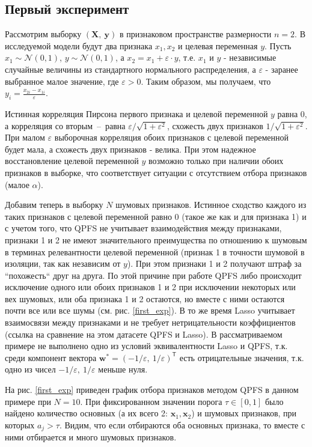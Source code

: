 \documentclass[12pt, twoside]{article}
\newcommand{\bx}{\mathbf{x}}
\newcommand{\by}{\mathbf{y}}
\newcommand{\bw}{\mathbf{w}}
\newcommand{\bX}{\mathbf{X}}
\newcommand{\cN}{\mathcal{N}}
\newcommand{\getT}{^{\mathsf{T}}}
\begin{document}
\subsection{Первый эксперимент}

Рассмотрим выборку $(\bX, \:\by)$ в признаковом пространстве размерности $n=2$. В исследуемой модели будут два признака $x_1, x_2$ и целевая переменная $y$. Пусть $x_1 \sim \cN(0, 1)$, $y \sim \cN(0, 1)$, а $x_2 = x_1 + \varepsilon \cdot y$, т.е. $x_1$ и $y$ - независимые случайные величины из стандартного нормального распределения, а $\varepsilon$ - заранее выбранное малое значение, где $\varepsilon > 0$. Таким образом, мы получаем, что $y_i = \frac{x_{2i} - x_{1i}}{\varepsilon}$.


Истинная корреляция Пирсона первого признака и целевой переменной $y$ равна 0, а корреляция со вторым~--~равна $\varepsilon / \sqrt{1 + \varepsilon^2}$, схожесть двух признаков $1 / \sqrt{1 + \varepsilon^2}$.   
При малом $\varepsilon$ выборочная корреляция обоих признаков с целевой переменной будет мала, а схожесть двух признаков - велика. При этом надежное восстановление целевой переменной $y$ возможно только при наличии обоих признаков в выборке, что соответствует ситуации с отсутствием отбора признаков (малое $\alpha$).

Добавим теперь в выборку $N$ шумовых признаков. Истинное сходство каждого из таких признаков с целевой переменной равно 0 (такое же как и для признака 1) и с учетом того, что QPFS не учитывает взаимодействия между признаками, признаки 1 и 2 не имеют значительного преимущества по отношению к шумовым в терминах релевантности целевой переменной (признак 1 в точности шумовой в изоляции, так как независим от $y$). При этом признаки 1 и 2 получают штраф за ``похожесть`` друг на друга. По этой причине при работе QPFS либо происходит исключение одного или обоих признаков 1 и 2 при исключении некоторых или вех шумовых, или оба признака 1 и 2 остаются, но вместе с ними остаются почти все или все шумы (см. рис. \ref{first_exp}). В то же время Lasso учитывает взаимосвязи между признаками и не требует нетрицательности коэффициентов (ссылка на сравнение на этом датасете QPFS и Lasso). В рассматриваемом примере не выполнено одно из условий эквивалентности Lasso и QPFS, т.к. среди компонент вектора $\bw^* = (-1 / \varepsilon,\:1 / \varepsilon)\getT$ есть отрицательные значения, т.к. одно из чисел $-1 / \varepsilon,\:1 / \varepsilon$ меньше нуля.

На рис. \ref{first_exp} приведен график отбора признаков методом QPFS в данном примере при $N = 10$. При фиксированном значении порога $\tau \in [0, 1]$ было найдено количество основных (а их всего 2: $\bx_1, \bx_2$) и шумовых признаков, при которых $a_j > \tau$. Видим, что если отбираются оба основных признака, то вместе с ними отбирается и много шумовых признаков.
\end{document}
